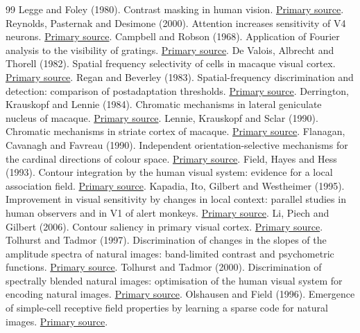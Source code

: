 \documentclass[11pt]{article}
\begin{document}
\begin{thebibliography}{99}
 Legge and Foley (1980). Contrast masking in human vision. \href{https://pubmed.ncbi.nlm.nih.gov/7463185/}{Primary source}.
 Reynolds, Pasternak and Desimone (2000). Attention increases sensitivity of V4 neurons. \href{https://pubmed.ncbi.nlm.nih.gov/10896165/}{Primary source}.
 Campbell and Robson (1968). Application of Fourier analysis to the visibility of gratings. \href{https://doi.org/10.1113/jphysiol.1968.sp008574}{Primary source}.
 De Valois, Albrecht and Thorell (1982). Spatial frequency selectivity of cells in macaque visual cortex. \href{https://pubmed.ncbi.nlm.nih.gov/7112954/}{Primary source}.
 Regan and Beverley (1983). Spatial-frequency discrimination and detection: comparison of postadaptation thresholds. \href{https://pubmed.ncbi.nlm.nih.gov/6663371/}{Primary source}.
 Derrington, Krauskopf and Lennie (1984). Chromatic mechanisms in lateral geniculate nucleus of macaque. \href{https://pubmed.ncbi.nlm.nih.gov/6512691/}{Primary source}.
 Lennie, Krauskopf and Sclar (1990). Chromatic mechanisms in striate cortex of macaque. \href{https://pubmed.ncbi.nlm.nih.gov/2303866/}{Primary source}.
 Flanagan, Cavanagh and Favreau (1990). Independent orientation-selective mechanisms for the cardinal directions of colour space. \href{https://pubmed.ncbi.nlm.nih.gov/2378069/}{Primary source}.
 Field, Hayes and Hess (1993). Contour integration by the human visual system: evidence for a local association field. \href{https://pubmed.ncbi.nlm.nih.gov/8447091/}{Primary source}.
 Kapadia, Ito, Gilbert and Westheimer (1995). Improvement in visual sensitivity by changes in local context: parallel studies in human observers and in V1 of alert monkeys. \href{https://pubmed.ncbi.nlm.nih.gov/7576633/}{Primary source}.
 Li, Piech and Gilbert (2006). Contour saliency in primary visual cortex. \href{https://pubmed.ncbi.nlm.nih.gov/16772175/}{Primary source}.
 Tolhurst and Tadmor (1997). Discrimination of changes in the slopes of the amplitude spectra of natural images: band-limited contrast and psychometric functions. \href{https://pubmed.ncbi.nlm.nih.gov/9509160/}{Primary source}.
 Tolhurst and Tadmor (2000). Discrimination of spectrally blended natural images: optimisation of the human visual system for encoding natural images. \href{https://pubmed.ncbi.nlm.nih.gov/11144821/}{Primary source}.
 Olshausen and Field (1996). Emergence of simple-cell receptive field properties by learning a sparse code for natural images. \href{https://www.nature.com/articles/381607a0}{Primary source}.

\end{thebibliography}
\end{document}
